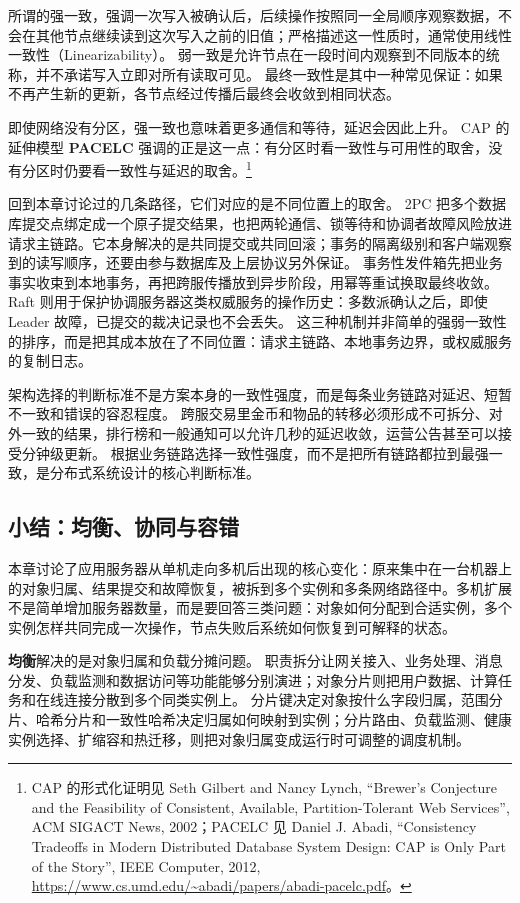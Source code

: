 所谓的强一致，强调一次写入被确认后，后续操作按照同一全局顺序观察数据，不会在其他节点继续读到这次写入之前的旧值；严格描述这一性质时，通常使用线性一致性（Linearizability）。
弱一致是允许节点在一段时间内观察到不同版本的统称，并不承诺写入立即对所有读取可见。
最终一致性是其中一种常见保证：如果不再产生新的更新，各节点经过传播后最终会收敛到相同状态。

即使网络没有分区，强一致也意味着更多通信和等待，延迟会因此上升。
CAP 的延伸模型 \textbf{PACELC} 强调的正是这一点：有分区时看一致性与可用性的取舍，没有分区时仍要看一致性与延迟的取舍。\footnote{CAP 的形式化证明见 Seth Gilbert and Nancy Lynch, ``Brewer's Conjecture and the Feasibility of Consistent, Available, Partition-Tolerant Web Services'', ACM SIGACT News, 2002；PACELC 见 Daniel J. Abadi, ``Consistency Tradeoffs in Modern Distributed Database System Design: CAP is Only Part of the Story'', IEEE Computer, 2012, \url{https://www.cs.umd.edu/~abadi/papers/abadi-pacelc.pdf}。}

回到本章讨论过的几条路径，它们对应的是不同位置上的取舍。
2PC 把多个数据库提交点绑定成一个原子提交结果，也把两轮通信、锁等待和协调者故障风险放进请求主链路。它本身解决的是共同提交或共同回滚；事务的隔离级别和客户端观察到的读写顺序，还要由参与数据库及上层协议另外保证。
事务性发件箱先把业务事实收束到本地事务，再把跨服传播放到异步阶段，用幂等重试换取最终收敛。
Raft 则用于保护协调服务器这类权威服务的操作历史：多数派确认之后，即使 Leader 故障，已提交的裁决记录也不会丢失。
这三种机制并非简单的强弱一致性的排序，而是把其成本放在了不同位置：请求主链路、本地事务边界，或权威服务的复制日志。

架构选择的判断标准不是方案本身的一致性强度，而是每条业务链路对延迟、短暂不一致和错误的容忍程度。
跨服交易里金币和物品的转移必须形成不可拆分、对外一致的结果，排行榜和一般通知可以允许几秒的延迟收敛，运营公告甚至可以接受分钟级更新。
根据业务链路选择一致性强度，而不是把所有链路都拉到最强一致，是分布式系统设计的核心判断标准。


\subsection{小结：均衡、协同与容错}\label{sec4:summary}

本章讨论了应用服务器从单机走向多机后出现的核心变化：原来集中在一台机器上的对象归属、结果提交和故障恢复，被拆到多个实例和多条网络路径中。多机扩展不是简单增加服务器数量，而是要回答三类问题：对象如何分配到合适实例，多个实例怎样共同完成一次操作，节点失败后系统如何恢复到可解释的状态。

\textbf{均衡}解决的是对象归属和负载分摊问题。
职责拆分让网关接入、业务处理、消息分发、负载监测和数据访问等功能能够分别演进；对象分片则把用户数据、计算任务和在线连接分散到多个同类实例上。
分片键决定对象按什么字段归属，范围分片、哈希分片和一致性哈希决定归属如何映射到实例；分片路由、负载监测、健康实例选择、扩缩容和热迁移，则把对象归属变成运行时可调整的调度机制。

